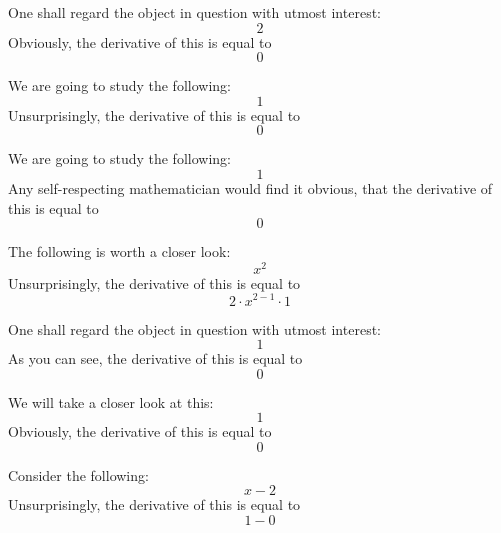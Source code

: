 \documentclass{article}
\begin{document}
One shall regard the object in question with utmost interest:
\begin{equation}
2 
\end{equation}
Obviously, the derivative of this is equal to
\begin{equation}
0 
\end{equation}

We are going to study the following:
\begin{equation}
1 
\end{equation}
Unsurprisingly, the derivative of this is equal to
\begin{equation}
0 
\end{equation}

We are going to study the following:
\begin{equation}
1 
\end{equation}
Any self-respecting mathematician would find it obvious, that the derivative of this is equal to
\begin{equation}
0 
\end{equation}

The following is worth a closer look:
\begin{equation}
x ^{2 } 
\end{equation}
Unsurprisingly, the derivative of this is equal to
\begin{equation}
2 \cdot x ^{2 - 1 } \cdot 1 
\end{equation}

One shall regard the object in question with utmost interest:
\begin{equation}
1 
\end{equation}
As you can see, the derivative of this is equal to
\begin{equation}
0 
\end{equation}

We will take a closer look at this:
\begin{equation}
1 
\end{equation}
Obviously, the derivative of this is equal to
\begin{equation}
0 
\end{equation}

Consider the following:
\begin{equation}
x - 2 
\end{equation}
Unsurprisingly, the derivative of this is equal to
\begin{equation}
1 - 0 
\end{equation}
\end{document}
